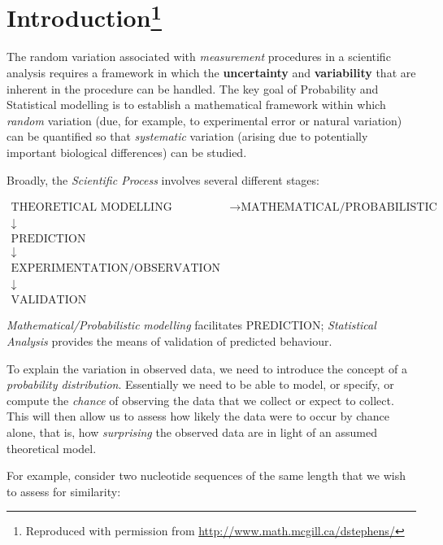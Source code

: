 \documentclass[]{book}
\let\rmarkdownfootnote\footnote%
\def\footnote{\protect\rmarkdownfootnote}
\theoremstyle{definition}
\theoremstyle{definition}
\theoremstyle{definition}
\theoremstyle{remark}
\begin{document}
\section*{\texorpdfstring{Introduction\footnote{Reproduced with
  permission from \url{http://www.math.mcgill.ca/dstephens/}}}{Introduction}}\label{introduction1}

The random variation associated with \emph{measurement} procedures in a
scientific analysis requires a framework in which the
\textbf{uncertainty} and \textbf{variability} that are inherent in the
procedure can be handled. The key goal of Probability and Statistical
modelling is to establish a mathematical framework within which
\emph{random} variation (due, for example, to experimental error or
natural variation) can be quantified so that \emph{systematic} variation
(arising due to potentially important biological differences) can be
studied.

Broadly, the \textit{Scientific Process} involves several different
stages:

\begin{equation*}
\begin{array}{cl}
\text{{THEORETICAL MODELLING}} & \rightarrow \text{{MATHEMATICAL/PROBABILISTIC MODELLING}} \\
\downarrow &  \\
\text{{PREDICTION}} &  \\
\downarrow &  \\
\text{{EXPERIMENTATION/OBSERVATION}} &  \\
\downarrow &  \\
\text{{VALIDATION}} &
\end{array}
\end{equation*}

\emph{Mathematical/Probabilistic} \emph{modelling} facilitates
PREDICTION; \emph{Statistical Analysis} provides the means of validation
of predicted behaviour.

To explain the variation in observed data, we need to introduce the
concept of a \emph{probability distribution}. Essentially we need to be
able to model, or specify, or compute the \emph{chance} of observing the
data that we collect or expect to collect. This will then allow us to
assess how likely the data were to occur by chance alone, that is, how
\emph{surprising} the observed data are in light of an assumed
theoretical model.

For example, consider two nucleotide sequences of the same length that
we wish to assess for similarity:
\end{document}
